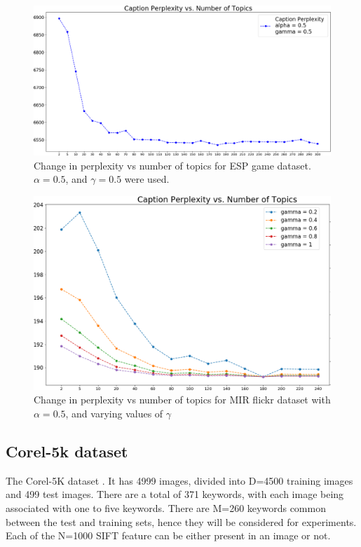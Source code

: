\documentclass[journal]{IEEEtran}
\begin{document}
\begin{figure}
    \centering
    \includegraphics[width=\columnwidth]{images/data3.png}
    \caption{Change in perplexity vs number of topics for ESP game dataset. $\alpha = 0.5 $, and $\gamma = 0.5$ were used.}
    \label{fig:espgame}
\end{figure}

\begin{figure}
    \centering
    \includegraphics[width=\columnwidth]{images/gamma2.png}
    \caption{Change in perplexity vs number of topics for MIR flickr dataset with $\alpha = 0.5 $, and varying values of $\gamma$}
    \label{fig:gamma2}
\end{figure}

\subsection{Corel-5k dataset}
The Corel-5K dataset \cite{Corel5k}. It has 4999 images, divided into D=4500 training images and 499 test images. There are a total of 371 keywords, with each image being associated with one to five keywords. There are M=260 keywords common between the test and training sets, hence they will be considered for experiments. Each of the N=1000 SIFT feature can be either present in an image or not.
\end{document}
